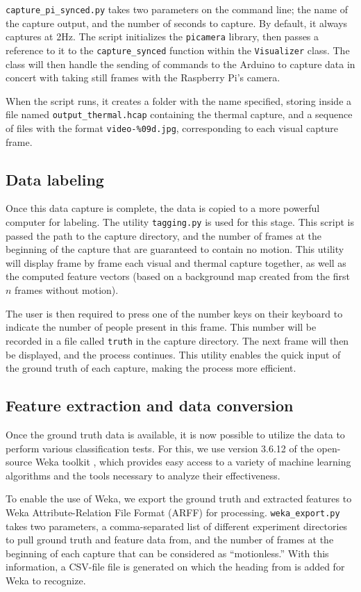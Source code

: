 \documentclass[../thesis/thesis.tex]{subfiles}
\begin{document}
\texttt{capture\_pi\_synced.py} takes two parameters on the command line; the name of the capture output, and the number of seconds to capture. By default, it always captures at 2Hz. The script initializes the \texttt{picamera} library, then passes a reference to it to the \texttt{capture\_synced} function within the \texttt{Visualizer} class. The class will then handle the sending of commands to the Arduino to capture data in concert with taking still frames with the Raspberry Pi's camera.

When the script runs, it creates a folder with the name specified, storing inside a file named \texttt{output\_thermal.hcap} containing the thermal capture, and a sequence of files with the format \texttt{video-\%09d.jpg}, corresponding to each visual capture frame.

\subsection{Data labeling}
Once this data capture is complete, the data is copied to a more powerful computer for labeling. The utility \texttt{tagging.py} is used for this stage. This script is passed the path to the capture directory, and the number of frames at the beginning of the capture that are guaranteed to contain no motion. This utility will display frame by frame each visual and thermal capture together, as well as the computed feature vectors (based on a background map created from the first $n$ frames without motion).

The user is then required to press one of the number keys on their keyboard to indicate the number of people present in this frame. This number will be recorded in a file called \texttt{truth} in the capture directory. The next frame will then be displayed, and the process continues. This utility enables the quick input of the ground truth of each capture, making the process more efficient.

\subsection{Feature extraction and data conversion}
Once the ground truth data is available, it is now possible to utilize the data to perform various classification tests. For this, we use version 3.6.12 of the open-source Weka toolkit \cite{Weka}, which provides easy access to a variety of machine learning algorithms and the tools necessary to analyze their effectiveness.

To enable the use of Weka, we export the ground truth and extracted features to Weka Attribute-Relation File Format (ARFF) for processing. \texttt{weka\_export.py} takes two parameters, a comma-separated list of different experiment directories to pull ground truth and feature data from, and the number of frames at the beginning of each capture that can be considered as ``motionless.'' With this information, a CSV-file file is generated on which the heading from  is added for Weka to recognize.
\end{document}
